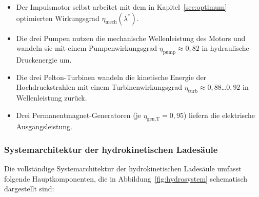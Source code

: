 ﻿\documentclass[a4paper,12pt]{article}
\begin{document}
\begin{itemize}
  \item Der Impulsmotor selbst arbeitet mit dem in Kapitel~\ref{sec:optimum}
    optimierten Wirkungsgrad $\eta_\text{mech}(\lambda^*)$.
  \item Die drei Pumpen nutzen die mechanische Wellenleistung des Motors und
    wandeln sie mit einem Pumpenwirkungsgrad $\eta_\text{pump} \approx 0{,}82$
    in hydraulische Druckenergie um.
  \item Die drei Pelton-Turbinen wandeln die kinetische Energie der
    Hochdruckstrahlen mit einem Turbinenwirkungsgrad
    $\eta_\text{turb} \approx 0{,}88$\ldots$0{,}92$ in Wellenleistung zurück.
  \item Drei Permanentmagnet-Generatoren (je $\eta_\text{gen,T} = 0{,}95$)
    liefern die elektrische Ausgangsleistung.
\end{itemize}

\subsubsection{Systemarchitektur der hydrokinetischen Ladesäule}

Die vollständige Systemarchitektur der hydrokinetischen Ladesäule umfasst
folgende Hauptkomponenten, die in Abbildung~\ref{fig:hydrosystem} schematisch
dargestellt sind:
\end{document}

